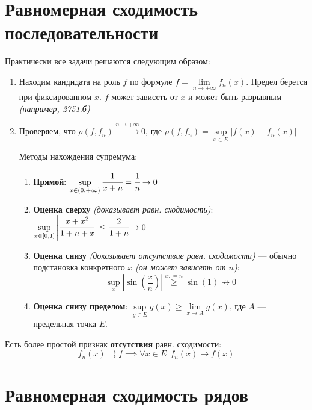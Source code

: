 

\cfoot{}
\rfoot{}



\section{Равномерная сходимость последовательности}

Практически все задачи решаются следующим образом:
\begin{enumerate}
    \item Находим кандидата на роль \(f\) по формуле \(f = \lim\limits_{n\to +\infty} f_n(x)\). Предел берется при фиксированном \(x\). \(f\) может зависеть от \(x\) и может быть разрывным \textit{(например, 2751.б)}
    \item Проверяем, что \(\rho(f, f_n) \xrightarrow{n\to +\infty} 0\), где \(\rho(f, f_n) = \sup\limits_{x\in E} |f(x) - f_n(x)|\)

          Методы нахождения супремума:
          \begin{enumerate}
              \item \textbf{Прямой}: \(\sup\limits_{x\in(0, +\infty)} \cfrac{1}{x + n} = \cfrac{1}{n} \to 0\)
              \item \textbf{Оценка сверху} \textit{(доказывает равн. сходимость)}: \( \sup\limits_{x\in[0, 1]} \left|\cfrac{x + x^2}{1 + n + x}\right| \leq \cfrac{2}{1 + n}\to 0\)
              \item \textbf{Оценка снизу} \textit{(доказывает отсутствие равн. сходимости)} --- обычно подстановка конкретного \(x\) \textit{(он может зависеть от \(n\))}:
                    \[\sup_{x} \left|\sin\left( \frac{x}{n} \right)\right| \stackrel{x: = n}{ \ge } \sin(1) \not\to 0\]
              \item \textbf{Оценка снизу пределом}: \(\sup\limits_{g\in E} g(x) \geq \lim\limits_{x\to A} g(x)\), где \(A\) --- предельная точка \(E\).
          \end{enumerate}
\end{enumerate}

Есть более простой признак \textbf{отсутствия} равн. сходимости:
\[f_n(x) \rightrightarrows f \implies \forall x\in E \ \ f_n(x) \to f(x)\]

\section{Равномерная сходимость рядов}

